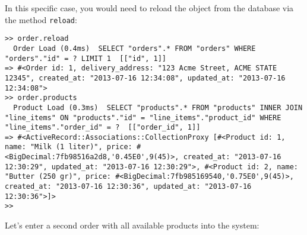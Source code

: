 \documentclass[a4paper]{book}
\newcounter{tab}[chapter]
\begin{document}
In this specific case, you would need to reload the object from the database via the method \texttt{reload}:

\begin{shaded}\begin{verbatim}
>> order.reload
  Order Load (0.4ms)  SELECT "orders".* FROM "orders" WHERE "orders"."id" = ? LIMIT 1  [["id", 1]]
=> #<Order id: 1, delivery_address: "123 Acme Street, ACME STATE 12345", created_at: "2013-07-16 12:34:08", updated_at: "2013-07-16 12:34:08">
>> order.products
  Product Load (0.3ms)  SELECT "products".* FROM "products" INNER JOIN "line_items" ON "products"."id" = "line_items"."product_id" WHERE "line_items"."order_id" = ?  [["order_id", 1]]
=> #<ActiveRecord::Associations::CollectionProxy [#<Product id: 1, name: "Milk (1 liter)", price: #<BigDecimal:7fb98516a2d8,'0.45E0',9(45)>, created_at: "2013-07-16 12:30:29", updated_at: "2013-07-16 12:30:29">, #<Product id: 2, name: "Butter (250 gr)", price: #<BigDecimal:7fb985169540,'0.75E0',9(45)>, created_at: "2013-07-16 12:30:36", updated_at: "2013-07-16 12:30:36">]>
>>
\end{verbatim}\end{shaded}

Let's enter a second order with all available products into the system:
\end{document}

